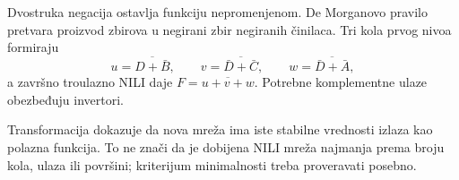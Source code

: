 
Dvostruka negacija ostavlja funkciju nepromenjenom. De Morganovo pravilo pretvara proizvod zbirova u negirani zbir negiranih činilaca. Tri kola prvog nivoa formiraju
\[
u=\overline{D+\bar B},\qquad v=\overline{\bar D+\bar C},\qquad
w=\overline{\bar D+\bar A},
\]
a završno troulazno NILI daje \(F=\overline{u+v+w}\). Potrebne komplementne ulaze obezbeđuju invertori.

Transformacija dokazuje da nova mreža ima iste stabilne vrednosti izlaza kao polazna funkcija. To ne znači da je dobijena NILI mreža najmanja prema broju kola, ulaza ili površini; kriterijum minimalnosti treba proveravati posebno.
